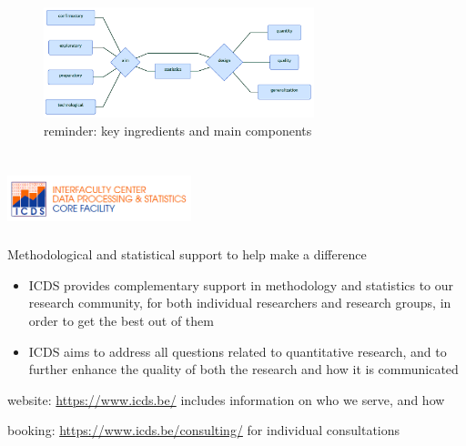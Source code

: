 \documentclass[]{article}
\begin{document}
\begin{figure}[htbp]
\centering
\includegraphics[width=0.70000\textwidth]{diagrammeR.png}
\caption{reminder: key ingredients and main components}
\end{figure}

\newpage

\section{\texorpdfstring{\protect\includegraphics[width=0.40000\textwidth]{icds.png}}{}}\label{section}

Methodological and statistical support to help make a difference

\begin{itemize}
\item
  ICDS provides complementary support in methodology and statistics to
  our research community, for both individual researchers and research
  groups, in order to get the best out of them
\item
  ICDS aims to address all questions related to quantitative research,
  and to further enhance the quality of both the research and how it is
  communicated
\end{itemize}

website: \url{https://www.icds.be/} includes information on who we
serve, and how

booking: \url{https://www.icds.be/consulting/} for individual
consultations
\end{document}
